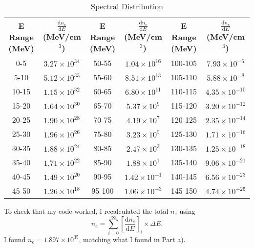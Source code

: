 \documentclass[11pt,letterpaper]{article}
\begin{document}
\begin{table}[!h]
\centering
\caption{Spectral Distribution}
\begin{tabular}{c|c|c|c|c|c}
\hline
E Range (MeV) & $\frac{\mathrm{d}n_e}{\mathrm{d}E}$ (MeV/cm$^3$) & E Range (MeV) & $\frac{\mathrm{d}n_e}{\mathrm{d}E}$ (MeV/cm$^3$) & 
E Range (MeV) & $\frac{\mathrm{d}n_e}{\mathrm{d}E}$ (MeV/cm$^3$)\\
\hline
0-5 & $3.27\times10^{34}$ & 50-55 & $1.04\times10^{16}$ & 100-105 & $7.93\times10^{-6}$\\
5-10 & $5.12\times10^{33}$ & 55-60 & $8.51\times10^{13}$ & 105-110 & $5.88\times10^{-8}$\\
10-15 & $1.15\times10^{32}$ & 60-65 & $6.80\times10^{11}$ & 110-115 & $4.35\times10^{-10}$\\
15-20 & $1.64\times10^{30}$ & 65-70 & $5.37\times10^{9}$ & 115-120 & $3.20\times10^{-12}$\\
20-25 & $1.90\times10^{28}$ & 70-75 & $4.19\times10^{7}$ & 120-125 & $2.35\times10^{-14}$\\
25-30 & $1.96\times10^{26}$ & 75-80 & $3.23\times10^{5}$ & 125-130 & $1.71\times10^{-16}$\\
30-35 & $1.88\times10^{24}$ & 80-85 & $2.47\times10^{3}$ & 130-135 & $1.25\times10^{-18}$\\
35-40 & $1.71\times10^{22}$ & 85-90 & $1.88\times10^{1}$ & 135-140 & $9.06\times10^{-21}$\\
40-45 & $1.49\times10^{20}$ & 90-95 & $1.42\times10^{-1}$ & 140-145 & $6.56\times10^{-23}$\\
45-50 & $1.26\times10^{18}$ & 95-100 & $1.06\times10^{-3}$ & 145-150 & $4.74\times10^{-25}$\\
\hline
\end{tabular}
\label{tab:twob}
\end{table}

To check that my code worked, I recalculated the total $n_e$ using
\begin{equation}
n_e=\displaystyle\sum\limits_{i=0}^{\infty} \left[\frac{\mathrm{d}n_e}{\mathrm{d}E}\right]_i\times\Delta E.
\end{equation}
I found $n_e=1.897\times10^{35}$, matching what I found in Part a).
\end{document}
